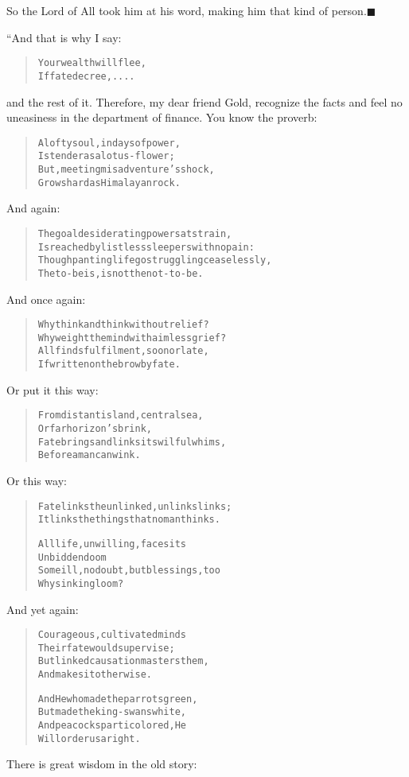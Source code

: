 \documentclass[article, twoside, 14pt]{memoir}
\newcommand{\qed}{\hfill \ensuremath{\blacksquare}}
\renewenvironment{verbatim}{%
\begin{quote}%
\vskip -10pt%
\begin{alltt}\normalfont\large}{\end{alltt}%
\end{quote}%
\vskip -10pt
} %
\begin{document}
So the Lord of All took him at his word, making him that kind of
person.\hyperref[s42]{\qed}

“And that is why I say:

\begin{verbatim}
Your wealth will flee,
If fate decree, ....
\end{verbatim}
and the rest of it. Therefore, my dear friend Gold, recognize the
facts and feel no uneasiness in the department of finance. You know
the proverb:

\begin{verbatim}
A lofty soul, in days of power,
Is tender as a lotus-flower;
But, meeting misadventure's shock,
Grows hard as Himalayan rock.
\end{verbatim}
And again:

\begin{verbatim}
The goal desiderating powers at strain,
Is reached by listless sleepers with no pain:
Though panting life go struggling ceaselessly,
The to-be is, is not the not-to-be.
\end{verbatim}
And once again:

\begin{verbatim}
Why think and think without relief?
Why weight the mind with aimless grief?
All finds fulfilment, soon or late,
If written on the brow by fate.
\end{verbatim}
Or put it this way:

\begin{verbatim}
From distant island, central sea,
Or far horizon's brink,
Fate brings and links its wilful whims,
Before a man can wink.
\end{verbatim}
Or this way:

\begin{verbatim}
Fate links the unlinked, unlinks links;
It links the things that no man thinks.

All life, unwilling, faces its
    Unbidden doom{\textemdash}
Some ill, no doubt, but blessings, too{\textemdash}
    Why sink in gloom?
\end{verbatim}
And yet again:

\begin{verbatim}
Courageous, cultivated minds
    Their fate would supervise;
But linked causation masters them,
    And makes it otherwise.

And He who made the parrots green,
    But made the king-swans white,
And peacocks particolored, He
    Will order us aright.
\end{verbatim}
There is great wisdom in the old story:
\end{document}
